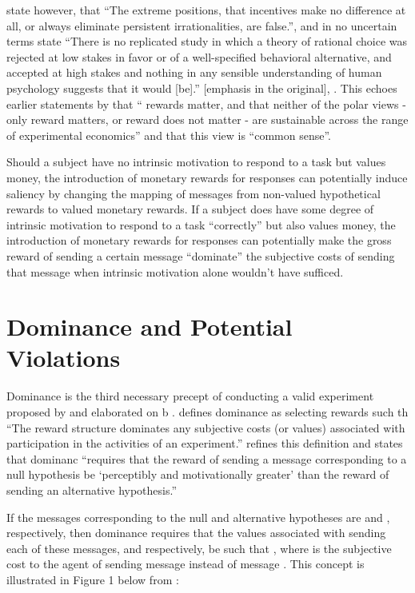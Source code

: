\documentclass[../main.tex]{subfiles}
\begin{document}
\textcite[8]{Camerer1999} state however, that \enquote{The extreme positions, that  incentives make no difference at all, or always eliminate persistent irrationalities, are false.}, and in no uncertain terms state \enquote{There is no replicated study in which a theory of rational choice was rejected at low stakes in favor or of a well-specified behavioral alternative, and accepted at high stakes \textelp{} and nothing in any sensible understanding of human psychology suggests that it would [be].} [emphasis in the original], \parencite*[33-34]{Camerer1999}.
This echoes earlier statements by \textcite[246]{Smith1993} that \enquote{\textelp{} rewards matter, and that neither of the polar views - only reward matters, or reward does not matter - are sustainable across the range of experimental economics} and that this view is \enquote{common sense}.

Should a subject have no intrinsic motivation to respond to a task but values money, the introduction of monetary rewards for responses can potentially induce saliency by changing the mapping of messages from non-valued hypothetical rewards to valued monetary rewards.
If a subject does have some degree of intrinsic motivation to respond to a task \enquote{correctly} but also values money, the introduction of monetary rewards for responses can potentially make the gross reward of sending a certain message \enquote{dominate} the subjective costs of sending that message when intrinsic motivation alone wouldn't have sufficed.

\section{Dominance and Potential Violations}

Dominance is the third necessary precept of conducting a valid experiment proposed by \textcite{Smith1982} and elaborated on b \textcite{Harrison1989, Harrison1992}.
\textcite[934]{Smith1982} defines dominance as selecting rewards such th \enquote{The reward structure dominates any subjective costs (or values) associated with participation in the activities of an experiment.}
\textcite[1426]{Harrison1992} refines this definition and states that dominanc \enquote{requires that the reward of sending a message corresponding to a null hypothesis be \enquote{perceptibly and motivationally greater} than the reward of sending an alternative hypothesis.}

If the messages corresponding to the null and alternative hypotheses are  and , respectively, then dominance requires that the values associated with sending each of these messages,  and  respectively, be such that , where  is the subjective cost to the agent of sending message  instead of message \parencite[1427]{Harrison1992}.
This concept is illustrated in Figure 1 below from \textcite[1427]{Harrison1992}:
\end{document}

